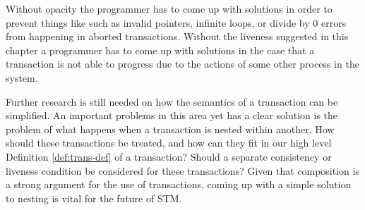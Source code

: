 Without opacity the programmer has to come up with solutions in order
to prevent things like such as invalid pointers, infinite loops, or divide by $0$ errors
from happening in aborted transactions.
Without the liveness suggested in this chapter a programmer has to come
up with solutions in the case that a transaction is not able to progress
due to the actions of some other process in the system.

Further research is still needed on how the semantics of a transaction
can be simplified.
An important problems in this area yet has a clear solution is the problem
of what happens when a transaction is nested within another.
How should these transactions be treated, and how can they fit in our
high level Definition \ref{def:trans-def} of a transaction?
Should a separate consistency or liveness condition be considered for these transactions?
Given that composition is a strong argument for the use of transactions,
coming up with a simple solution to nesting is vital for the future of STM.
